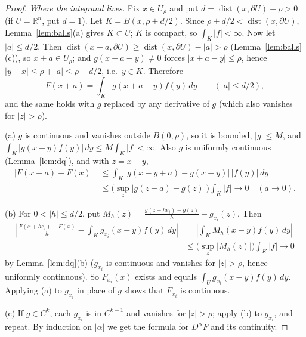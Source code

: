 \documentclass[11pt]{article}
\theoremstyle{plain}
\theoremstyle{definition}
\theoremstyle{remark}
\begin{document}
\begin{proof}
\emph{Where the integrand lives.} Fix $x \in U_\rho$ and put $d = \operatorname{dist}(x, \partial U) - \rho > 0$ (if $U = \mathbb{R}^n$, put $d = 1$). Let $K = B(x, \rho + d/2)$. Since $\rho + d/2 < \operatorname{dist}(x,\partial U)$, Lemma~\ref{lem:balls}(a) gives $K \subset U$; $K$ is compact, so $\int_K |f| < \infty$. Now let $|a| \leq d/2$. Then $\operatorname{dist}(x + a, \partial U) \ge \operatorname{dist}(x,\partial U) - |a| > \rho$ (Lemma~\ref{lem:balls}(c)), so $x + a \in U_\rho$; and $g(x + a - y) \neq 0$ forces $|x + a - y| \leq \rho$, hence $|y - x| \leq \rho + |a| \le \rho + d/2$, i.e.\ $y \in K$. Therefore
$$ F(x + a) = \int_K g(x + a - y) f(y)\, dy \qquad (|a| \leq d/2), $$
and the same holds with $g$ replaced by any derivative of $g$ (which also vanishes for $|z| > \rho$).

(a) $g$ is continuous and vanishes outside $B(0,\rho)$, so it is bounded, $|g| \leq M$, and $\int_K |g(x-y) f(y)|\, dy \leq M\int_K|f| < \infty$. Also $g$ is uniformly continuous (Lemma~\ref{lem:dq}), and with $z = x - y$,
\begin{align*}
|F(x + a) - F(x)| &\leq \int_K |g(x - y + a) - g(x - y)|\,|f(y)|\, dy \\
&\leq \Big(\sup_{z}|g(z + a) - g(z)|\Big) \int_K |f| \to 0 \quad (a \to 0).
\end{align*}

(b) For $0 < |h| \leq d/2$, put $M_h(z) = \frac{g(z+he_i) - g(z)}{h} - g_{x_i}(z)$. Then
\begin{align*}
\left| \frac{F(x + he_i) - F(x)}{h} - \int_K g_{x_i}(x - y) f(y)\, dy \right| &= \left| \int_K M_h(x-y) f(y)\, dy \right| \\
&\leq \Big(\sup_z |M_h(z)|\Big)\int_K |f| \to 0
\end{align*}
by Lemma~\ref{lem:dq}(b) ($g_{x_i}$ is continuous and vanishes for $|z| > \rho$, hence uniformly continuous). So $F_{x_i}(x)$ exists and equals $\int_U g_{x_i}(x-y) f(y)\, dy$. Applying (a) to $g_{x_i}$ in place of $g$ shows that $F_{x_i}$ is continuous.

(c) If $g \in C^k$, each $g_{x_i}$ is in $C^{k-1}$ and vanishes for $|z| > \rho$; apply (b) to $g_{x_i}$, and repeat. By induction on $|\alpha|$ we get the formula for $D^\alpha F$ and its continuity.
\end{proof}
\end{document}
